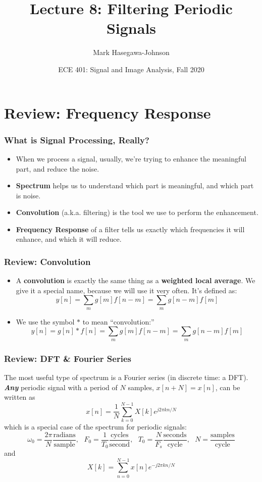 \documentclass{beamer}
\title{Lecture 8: Filtering Periodic Signals}
\author{Mark Hasegawa-Johnson}
\date{ECE 401: Signal and Image Analysis, Fall 2020}
\begin{document}
\begin{frame}
  \maketitle
\end{frame}

\begin{frame}
  \tableofcontents
\end{frame}

\section[Review]{Review: Frequency Response}
\setcounter{subsection}{1}

\begin{frame}
  \frametitle{What is Signal Processing, Really?}

  \begin{itemize}
  \item When we process a signal, usually, we're trying to
    enhance the meaningful part, and reduce the noise.
  \item {\bf Spectrum} helps us  to understand which part is
    meaningful, and which part is noise.
  \item {\bf Convolution} (a.k.a. filtering) is the tool we use to
    perform the enhancement.
  \item {\bf Frequency Response} of a filter tells us exactly which
    frequencies it will enhance, and which it will reduce.
  \end{itemize}
\end{frame}

\begin{frame}
  \frametitle{Review: Convolution}
  \begin{itemize}
  \item A {\bf convolution} is exactly the same thing as a {\bf weighted local average}.
    We give it a special name, because we will use it very often.  It's defined as:
    \[
    y[n] = \sum_m g[m] f[n-m] = \sum_m g[n-m] f[m]
    \]
  \item 
    We use the symbol $\ast$ to mean ``convolution:''
    \[
    y[n]=g[n]\ast f[n] = \sum_m g[m] f[n-m] = \sum_m g[n-m] f[m]
    \]
  \end{itemize}
\end{frame}

\begin{frame}
  \frametitle{Review: DFT \& Fourier Series}

  The most useful type of spectrum is a Fourier series (in discrete
  time: a DFT).  {\bf\em Any} periodic signal with a period of $N$
  samples, $x[n+N] = x[n]$, can be written as
  \[
  x[n] = \frac{1}{N}\sum_{k=0}^{N-1} X[k] e^{j2\pi kn/N}
  \]
  which is a special case of the spectrum for periodic signals:
  \[
  \omega_0=\frac{2\pi}{N}\frac{\mbox{radians}}{\mbox{sample}},~~~
  F_0=\frac{1}{T_0}\frac{\mbox{cycles}}{\mbox{second}},~~~
  T_0=\frac{N}{F_s}\frac{\mbox{seconds}}{\mbox{cycle}},~~~
  N = \frac{\mbox{samples}}{\mbox{cycle}}
  \]
  and
  \[
  X[k] = \sum_{n=0}^{N-1} x[n]e^{-j2\pi kn/N}  
  \]
\end{frame}
\end{document}
